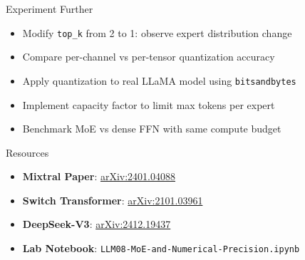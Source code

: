 \documentclass[aspectratio=169,10pt]{beamer}
\begin{document}
\begin{frame}{Experiment Further}
    \begin{itemize}
        \item Modify \texttt{top\_k} from 2 to 1: observe expert distribution change
        \item Compare per-channel vs per-tensor quantization accuracy
        \item Apply quantization to real LLaMA model using \texttt{bitsandbytes}
        \item Implement capacity factor to limit max tokens per expert
        \item Benchmark MoE vs dense FFN with same compute budget
    \end{itemize}

    \vspace{0.5cm}
    \begin{block}{Resources}
        \begin{itemize}
            \item \textbf{Mixtral Paper}: \href{https://arxiv.org/abs/2401.04088}{arXiv:2401.04088}
            \item \textbf{Switch Transformer}: \href{https://arxiv.org/abs/2101.03961}{arXiv:2101.03961}
            \item \textbf{DeepSeek-V3}: \href{https://arxiv.org/abs/2412.19437}{arXiv:2412.19437}
            \item \textbf{Lab Notebook}: \texttt{LLM08-MoE-and-Numerical-Precision.ipynb}
        \end{itemize}
    \end{block}
\end{frame}
\end{document}
